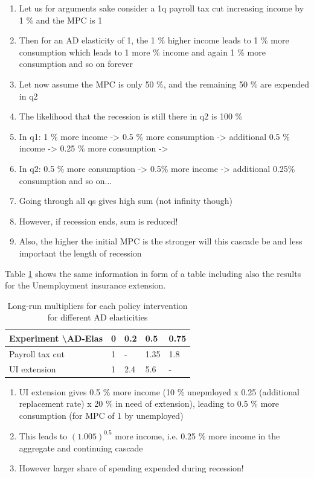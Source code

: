 \documentclass[]{article}
\begin{document}
\begin{enumerate}
	\item Let us for arguments sake consider a 1q payroll tax cut increasing income by 1 \% and the MPC is 1
	\item Then for an AD elasticity of 1, the 1 \% higher income leads to 1 \% more consumption which leads to 1 more \% income and again 1 \% more consumption and so on forever
	\item Let now assume the MPC is only 50 \%, and the remaining 50 \% are expended in q2
	\item The likelihood that the recession is still there in q2 is 100 \%
	\item In q1: 1 \% more income -> 0.5 \% more consumption -> additional 0.5 \% income -> 0.25 \% more consumption ->
	\item In q2: 0.5 \% more consumption -> 0.5\% more income -> additional 0.25\% consumption and so on...
	\item Going through all qs gives high sum (not infinity though)
	\item However, if recession ends, sum is reduced!
	\item Also, the higher the initial MPC is the stronger will this cascade be and less important the length of recession
\end{enumerate}


Table \ref{tab:NPVADelas} shows the same information in form of a table including also the results for the Unemployment insurance extension.

\begin{table}[htb]
	\centering
	\begin{tabular}{@{}lllll@{}}
		\toprule
		Experiment \textbackslash AD-Elas & 0 & 0.2 & 0.5  & 0.75 \\ \midrule
		Payroll tax cut                   & 1 & -   & 1.35 & 1.8  \\
		UI extension                      & 1 & 2.4 & 5.6  & -    \\ \bottomrule
	\end{tabular}	
	\caption{Long-run multipliers for each policy intervention for different AD elasticities}
	\label{tab:NPVADelas}
\end{table}

\begin{enumerate}
	\item UI extension gives 0.5 \% more income (10 \% unepmloyed x 0.25 (additional replacement rate) x 20 \% in need of extension), leading to 0.5 \% more consumption (for MPC of 1 by unemployed)
	\item This leads to $(1.005)^{0.5}$ more income, i.e. 0.25 \% more income in the aggregate and continuing cascade
	\item However larger share of spending expended during recession!
\end{enumerate}
\end{document}

